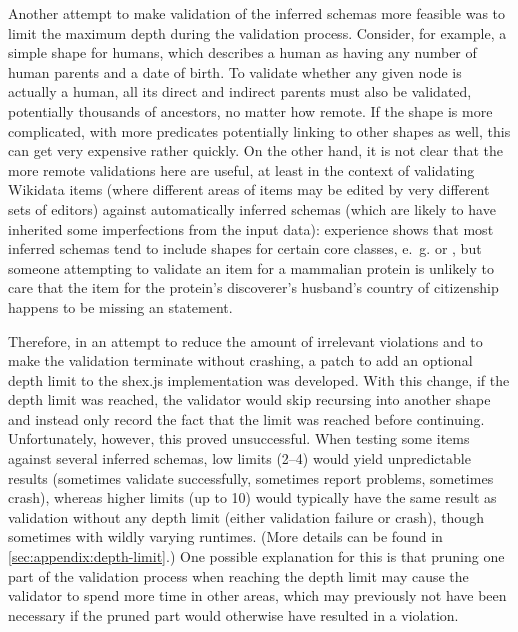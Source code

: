 Another attempt to make validation of the inferred schemas more feasible
was to limit the maximum depth during the validation process. %
Consider, for example, a simple shape for humans, %
which describes a human as having any number of human parents and a date of birth.
To validate whether any given node is actually a human,
all its direct and indirect parents must also be validated,
potentially thousands of ancestors, no matter how remote.
If the shape is more complicated,
with more predicates potentially linking to other shapes as well,
this can get very expensive rather quickly.
On the other hand, it is not clear that the more remote validations here are useful,
at least in the context of validating Wikidata items
(where different areas of items may be edited by very different sets of editors)
against automatically inferred schemas
(which are likely to have inherited some imperfections from the input data): %
experience shows that %
most inferred schemas tend to include shapes for certain core classes,
e.~g.  or ,
but someone attempting to validate an item for a mammalian protein
is unlikely to care that the item for the protein’s discoverer’s husband’s country of citizenship %
happens to be missing an  statement.

Therefore, %
in an attempt to reduce the amount of irrelevant violations
and to make the validation terminate without crashing,
a patch to add an optional depth limit to the shex.js implementation was developed.
With this change, if the depth limit was reached,
the validator would skip recursing into another shape
and instead only record the fact that the limit was reached before continuing.
Unfortunately, however, this proved unsuccessful.
When testing some items against several inferred schemas,
low limits (2–4) would yield unpredictable results
(sometimes validate successfully, sometimes report problems, sometimes crash),
whereas higher limits (up to 10) would typically have the same result as validation without any depth limit
(either validation failure or crash),
though sometimes with wildly varying runtimes.
(More details can be found in \cref{sec:appendix:depth-limit}.)
One possible explanation for this is that pruning one part of the validation process when reaching the depth limit
may cause the validator to spend more time in other areas,
which may previously not have been necessary if the pruned part would otherwise have resulted in a violation.

